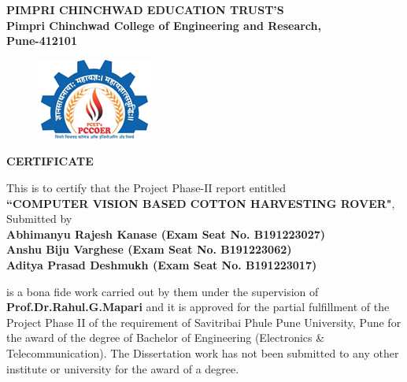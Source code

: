 \documentclass[12pt,a4paper]{report}
\begin{document}
\begin{center}
\bf{PIMPRI CHINCHWAD EDUCATION TRUST'S\\
Pimpri Chinchwad College of Engineering and Research,\\ Pune-412101}\\
\end{center}
\vspace*{0.3in}
\begin{figure}[!htb]
\begin{center}
\includegraphics[scale=1.0]{images/logo/pccoelogo.png}
\end{center}
\end{figure}
\begin{center}
{\huge \textbf{CERTIFICATE}}\\
\vspace*{0.3in}

This is to certify that the Project Phase-II report entitled \\
\vspace*{0.1in}
{\bf{``COMPUTER VISION BASED COTTON HARVESTING ROVER"}},\\
\vspace*{0.1in}
Submitted by \\
\vspace*{0.1in}
\bf{
Abhimanyu Rajesh Kanase \hspace*{0.2in} (Exam Seat No. B191223027)\\
Anshu Biju Varghese\hspace*{0.5in} (Exam Seat No. B191223062)\\
Aditya Prasad Deshmukh  \hspace*{0.3in} (Exam Seat No. B191223017)}\\
\end{center}


\vskip 0.2in
\noindent
is a bona fide work carried out by them under the supervision of {\bf{Prof.Dr.Rahul.G.Mapari}} and it is approved for the partial fulfillment of the Project Phase II of the
requirement of Savitribai Phule Pune University, Pune for the award of the degree of
Bachelor of Engineering (Electronics \& Telecommunication). The Dissertation work has
not been submitted to any other institute or university for the award of a degree.
\end{document}
